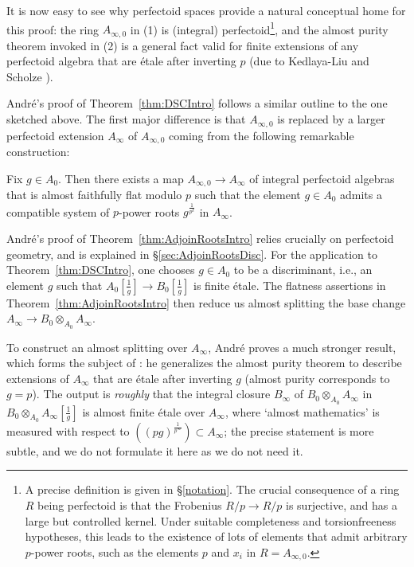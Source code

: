 \documentclass[10pt,reqno]{amsart}
\begin{document}
It is now easy to see why perfectoid spaces  provide a natural conceptual home for this proof: the ring $A_{\infty,0}$ in (1) is (integral) perfectoid\footnote{A precise definition is given in \S \ref{notation}. The crucial consequence of a ring $R$ being perfectoid is that the Frobenius $R/p \to R/p$ is surjective, and has a large but controlled kernel. Under suitable completeness and torsionfreeness hypotheses, this leads to the existence of lots of  elements that admit arbitrary $p$-power roots, such as the elements $p$ and $x_i$ in $R = A_{\infty,0}$.}, and the almost purity theorem invoked in (2) is a general fact valid for finite extensions of any perfectoid algebra that are \'etale after inverting $p$ (due to Kedlaya-Liu \cite{KedlayaLiu} and Scholze \cite{ScholzePerfectoidSpaces}). 

Andr\'e's proof of Theorem~\ref{thm:DSCIntro} follows a similar outline to the one sketched above. The first major difference is that $A_{\infty,0}$ is replaced by a larger perfectoid extension $A_\infty$ of $A_{\infty,0}$ coming from the following remarkable construction:

\begin{theorem}[Andr\'e]
\label{thm:AdjoinRootsIntro}
Fix $g \in A_0$. Then there exists a map $A_{\infty,0} \to A_\infty$ of integral perfectoid algebras that is almost faithfully flat modulo $p$ such that the element $g \in A_0$ admits a compatible system of $p$-power roots $g^{\frac{1}{p^k}}$ in $A_\infty$.
\end{theorem} 

Andr\'e's proof of Theorem~\ref{thm:AdjoinRootsIntro} relies crucially on perfectoid geometry, and is explained in \S \ref{sec:AdjoinRootsDisc}. For the application to Theorem~\ref{thm:DSCIntro}, one chooses $g \in A_0$ to be a discriminant, i.e., an element $g$ such that $A_0[\frac{1}{g}] \to B_0[\frac{1}{g}]$ is finite \'etale. The flatness assertions in Theorem~\ref{thm:AdjoinRootsIntro} then reduce us almost splitting the base change $A_\infty \to B_0 \otimes_{A_0} A_\infty$. 

To construct an almost splitting over $A_\infty$, Andr\'e proves a much stronger result, which forms the subject of \cite{AndrePAL}: he generalizes the almost purity theorem to describe extensions of $A_\infty$ that are \'etale after inverting $g$ (almost purity corresponds to $g=p$). The output is {\em roughly} that the integral closure $B_\infty$ of $B_0 \otimes_{A_0} A_\infty$ in $B_0 \otimes_{A_0} A_\infty[\frac{1}{g}]$ is almost finite \'etale over $A_\infty$, where `almost mathematics' is measured with respect to $((pg)^{\frac{1}{p^\infty}}) \subset A_\infty$; the precise statement is more subtle, and we do not formulate it  here as we do not need it.
\end{document}
